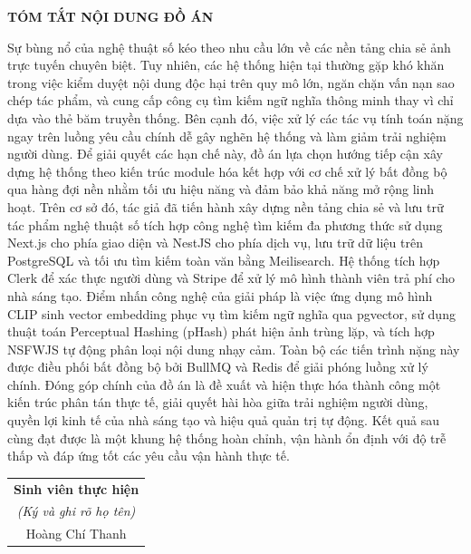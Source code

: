 \begin{center}
    \Large{\textbf{TÓM TẮT NỘI DUNG ĐỒ ÁN}}\\
\end{center}
\vspace{1cm}

Sự bùng nổ của nghệ thuật số kéo theo nhu cầu lớn về các nền tảng chia sẻ ảnh trực tuyến chuyên biệt. Tuy nhiên, các hệ thống hiện tại thường gặp khó khăn trong việc kiểm duyệt nội dung độc hại trên quy mô lớn, ngăn chặn vấn nạn sao chép tác phẩm, và cung cấp công cụ tìm kiếm ngữ nghĩa thông minh thay vì chỉ dựa vào thẻ băm truyền thống. Bên cạnh đó, việc xử lý các tác vụ tính toán nặng ngay trên luồng yêu cầu chính dễ gây nghẽn hệ thống và làm giảm trải nghiệm người dùng. Để giải quyết các hạn chế này, đồ án lựa chọn hướng tiếp cận xây dựng hệ thống theo kiến trúc module hóa kết hợp với cơ chế xử lý bất đồng bộ qua hàng đợi nền nhằm tối ưu hiệu năng và đảm bảo khả năng mở rộng linh hoạt. Trên cơ sở đó, tác giả đã tiến hành xây dựng nền tảng chia sẻ và lưu trữ tác phẩm nghệ thuật số tích hợp công nghệ tìm kiếm đa phương thức sử dụng Next.js cho phía giao diện và NestJS cho phía dịch vụ, lưu trữ dữ liệu trên PostgreSQL và tối ưu tìm kiếm toàn văn bằng Meilisearch. Hệ thống tích hợp Clerk để xác thực người dùng và Stripe để xử lý mô hình thành viên trả phí cho nhà sáng tạo. Điểm nhấn công nghệ của giải pháp là việc ứng dụng mô hình CLIP sinh vector embedding phục vụ tìm kiếm ngữ nghĩa qua pgvector, sử dụng thuật toán Perceptual Hashing (pHash) phát hiện ảnh trùng lặp, và tích hợp NSFWJS tự động phân loại nội dung nhạy cảm. Toàn bộ các tiến trình nặng này được điều phối bất đồng bộ bởi BullMQ và Redis để giải phóng luồng xử lý chính. Đóng góp chính của đồ án là đề xuất và hiện thực hóa thành công một kiến trúc phân tán thực tế, giải quyết hài hòa giữa trải nghiệm người dùng, quyền lợi kinh tế của nhà sáng tạo và hiệu quả quản trị tự động. Kết quả sau cùng đạt được là một khung hệ thống hoàn chỉnh, vận hành ổn định với độ trễ thấp và đáp ứng tốt các yêu cầu vận hành thực tế.
\begin{flushright}
\begin{tabular}{@{}c@{}}
\textbf{Sinh viên thực hiện}\\
\textit{(Ký và ghi rõ họ tên)}\\[1.5cm]
Hoàng Chí Thanh
\end{tabular}
\end{flushright}